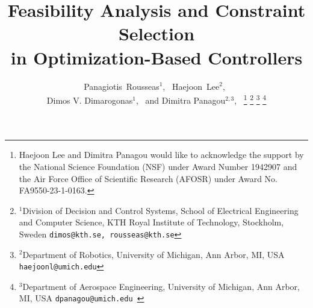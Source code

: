 \documentclass[letterpaper, 10 pt, conference]{ieeeconf}  %
\begin{document}
%
\title{\color{red}Feasibility Analysis and Constraint Selection \\ in Optimization-Based Controllers}


\author{ Panagiotis~Rousseas$^{1}$,~  Haejoon~Lee$^{2}$,~ \\ Dimos V. Dimarogonas$^{1}$,~ and Dimitra Panagou$^{2,3}$,~ 
\thanks{Haejoon Lee and Dimitra Panagou would like to acknowledge the support by the National Science Foundation (NSF) under Award Number 1942907 and the Air Force Office of Scientific Research (AFOSR) under Award No. FA9550-23-1-0163.}%
\thanks{$^{1}$Division of Decision and Control Systems,
    School of Electrical Engineering and Computer Science,
        KTH Royal Institute of Technology, Stockholm, Sweden
        {\tt\small dimos@kth.se, rousseas@kth.se}}%
\thanks{$^{2}$Department of Robotics,
        University of Michigan, Ann Arbor, MI, USA
        {\tt\small haejoonl@umich.edu}}%
\thanks{$^{3}$Department of Aerospace Engineering,
        University of Michigan, Ann Arbor, MI, USA
        {\tt\small dpanagou@umich.edu }}%
}


\maketitle
\end{document}
